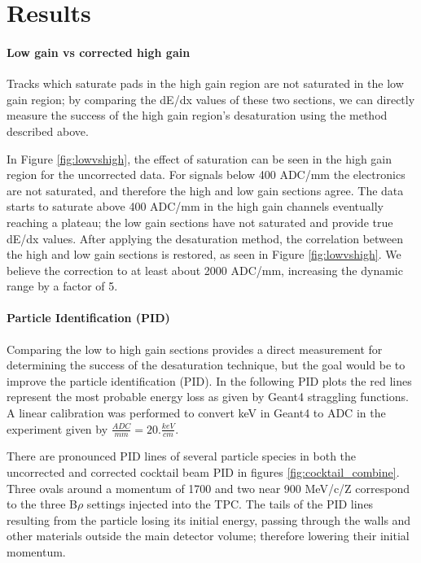 \documentclass[review]{elsarticle}
\begin{document}
\section{Results}
\paragraph{Low gain vs corrected high gain}

Tracks which saturate pads in the high gain region are not saturated in the low gain region; by comparing the dE/dx values of these two sections, we can directly measure the success of the high gain region's desaturation using the method described above.  
 
In Figure \ref{fig:lowvshigh}, the effect of saturation can be seen in the high gain region for the uncorrected data. For signals below 400 ADC/mm the electronics are not saturated, and therefore the high and low gain sections agree. The data starts to saturate above 400 ADC/mm in the high gain channels eventually reaching a plateau; the low gain sections have not saturated and provide true dE/dx values.
 After applying the desaturation method, the correlation between the high and low gain sections is restored, as seen in Figure \ref{fig:lowvshigh}. We believe the correction to at least about 2000 ADC/mm, increasing the dynamic range by a factor of 5.

\paragraph{Particle Identification (PID)}


Comparing the low to high gain sections provides a direct measurement for determining the success of the desaturation technique, but the goal would be to improve the particle identification (PID). In the following PID plots the red lines represent the most probable energy loss as given by Geant4 straggling functions. A linear calibration was performed to convert keV in Geant4 to ADC in the experiment given by $\frac{ADC}{mm} = 20. \frac{keV}{cm}$.

There are pronounced PID lines of several particle species in both the uncorrected and corrected cocktail beam PID in figures \ref{fig:cocktail_combine}. Three ovals around a momentum of 1700 and two near 900 MeV/c/Z correspond to the three B$\rho$ settings injected into the TPC. The tails of the PID lines resulting from the particle losing its initial energy, passing through the walls and other materials outside the main detector volume; therefore lowering their initial momentum. 
\end{document}
